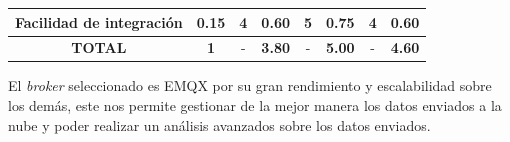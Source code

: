 \begin{tabla}[brk]
{\begin{tabular}{|c|c|c|c|c|c|c|c|}
\hline
Facilidad de integración                                                                                  & 0.15                                                                       & 4               & 0.60                  & 5               & 0.75                 & 4               & 0.60                  \\ 
\hline
\textbf{TOTAL}                                                                                            & \textbf{1}                                                                 & -               & \textbf{3.80}         & -               & \textbf{5.00}        & -               & \textbf{4.60}         \\
\hline
\end{tabular}
}
\end{tabla}

El \textit{broker} seleccionado es EMQX por su gran rendimiento y escalabilidad sobre los demás, este nos permite gestionar de la mejor manera los datos enviados a la nube y poder realizar un análisis avanzados sobre los datos enviados.

